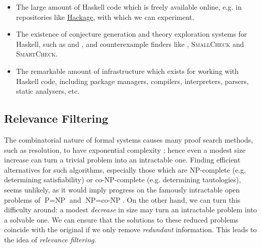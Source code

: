 \begin{itemize}

\item The large amount of Haskell code which is freely available online, e.g. in repositories like \href{http://hackage.haskell.org}{Hackage}, with which we can experiment.

\item The existence of conjecture generation and theory exploration systems for Haskell, such as \qspec{} and \hspec{}, and counterexample finders like \qcheck{}, \textsc{SmallCheck} and \textsc{SmartCheck}.

\item The remarkable amount of infrastructure which exists for working with Haskell code, including package managers, compilers, interpreters, parsers, static analysers, etc.

\end{itemize}

\iffalse
TODO
\subsection{Conjecture Generation}

The task of \emph{conjecture generation} lies at the heart of theory exploration, and

\subsubsection{Lemma generation}

\fi

\subsection{Relevance Filtering}
\label{sec:relevance}

\citep{kuhlwein2012overview}

The combinatorial nature of formal systems causes many proof search methods, such as resolution, to have exponential complexity \citep{haken1985intractability}; hence even a modest size increase can turn a trivial problem into an intractable one. Finding efficient alternatives for such algorithms, especially those which are NP-complete (e.g. determining satisfiability) or co-NP-complete (e.g. determining tautologies), seems unlikely, as it would imply progress on the famously intractable open problems of $\text{P} = \text{NP}$ and $\text{NP} = \text{co-NP}$. On the other hand, we can turn this difficulty around: a modest \emph{decrease} in size may turn an intractable problem into a solvable one. We can ensure that the solutions to these reduced problems coincide with the original if we only remove \emph{redundant} information. This leads to the idea of \emph{relevance filtering}.

